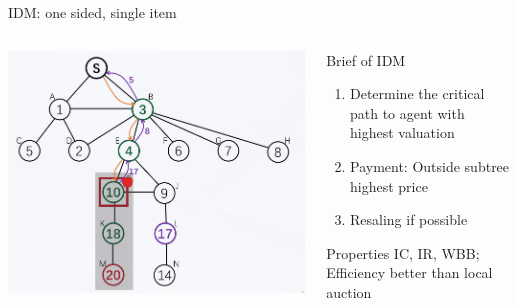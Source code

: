 \documentclass{beamer}
\begin{document}
\begin{frame}{IDM: one sided, single item}
	\begin{columns}
		\begin{column}{0.3\textwidth}
			\begin{center}
				\includegraphics[width=\textwidth]{IDM-example}
			\end{center}
		\end{column}
		\begin{column}{0.7\textwidth}
			\begin{block}{Brief of IDM}
				\begin{enumerate}
					\item Determine the critical path to agent with highest valuation
					\item Payment: Outside subtree highest price
					\item Resaling if possible
				\end{enumerate}
			\end{block}
			\begin{block}{Properties}
				IC, IR, WBB; Efficiency better than local auction
			\end{block}
		\end{column}
	\end{columns}
\end{frame}
\end{document}
